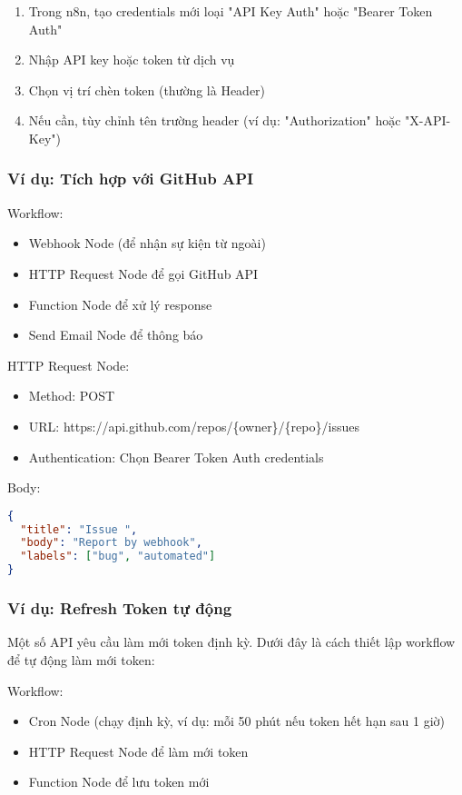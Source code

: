 \begin{enumerate}
    \item Trong n8n, tạo credentials mới loại "API Key Auth" hoặc "Bearer Token Auth"
    \item Nhập API key hoặc token từ dịch vụ
    \item Chọn vị trí chèn token (thường là Header)
    \item Nếu cần, tùy chỉnh tên trường header (ví dụ: "Authorization" hoặc "X-API-Key")
\end{enumerate}

\subsubsection{Ví dụ: Tích hợp với GitHub API}

Workflow:
\begin{itemize}
    \item Webhook Node (để nhận sự kiện từ ngoài)
    \item HTTP Request Node để gọi GitHub API
    \item Function Node để xử lý response
    \item Send Email Node để thông báo
\end{itemize}

HTTP Request Node:
\begin{itemize}
    \item Method: POST
    \item URL: https://api.github.com/repos/\{owner\}/\{repo\}/issues
    \item Authentication: Chọn Bearer Token Auth credentials
\end{itemize}
Body:
\begin{lstlisting}[language=JSON]
{
  "title": "Issue ",
  "body": "Report by webhook",
  "labels": ["bug", "automated"]
}
\end{lstlisting}

\subsubsection{Ví dụ: Refresh Token tự động}

Một số API yêu cầu làm mới token định kỳ. Dưới đây là cách thiết lập workflow để tự động làm mới token:

Workflow:
\begin{itemize}
    \item Cron Node (chạy định kỳ, ví dụ: mỗi 50 phút nếu token hết hạn sau 1 giờ)
    \item HTTP Request Node để làm mới token
    \item Function Node để lưu token mới
\end{itemize}

